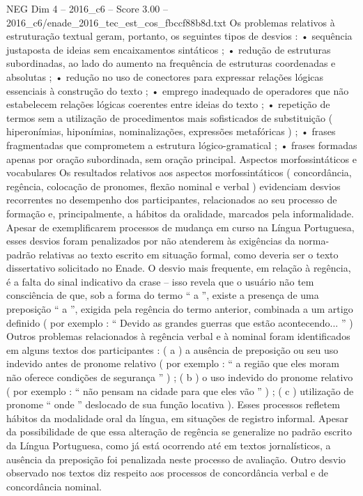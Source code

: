 \begin{textsample}{NEG Dim 4 – 2016\_c6 – Score 3.00 – 2016\_c6/enade\_2016\_tec\_est\_cos\_fbccf88b8d.txt}
Os problemas relativos à estruturação textual geram, portanto, os seguintes tipos de desvios : • sequência justaposta de ideias sem encaixamentos sintáticos ; • redução de estruturas subordinadas, ao lado do aumento na frequência de estruturas coordenadas e absolutas ; • redução no uso de conectores para expressar relações lógicas essenciais à construção do texto ; • emprego inadequado de operadores que não estabelecem relações lógicas coerentes entre ideias do texto ; • repetição de termos sem a utilização de procedimentos mais sofisticados de substituição ( hiperonímias, hiponímias, nominalizações, expressões metafóricas ) ; • frases fragmentadas que comprometem a estrutura lógico-gramatical ; • frases formadas apenas por oração subordinada, sem oração principal.
Aspectos morfossintáticos e vocabulares Os resultados relativos aos aspectos morfossintáticos ( concordância, regência, colocação de pronomes, flexão nominal e verbal ) evidenciam desvios recorrentes no desempenho dos participantes, relacionados ao seu processo de formação e, principalmente, a hábitos da oralidade, marcados pela informalidade.
Apesar de exemplificarem processos de mudança em curso na Língua Portuguesa, esses desvios foram penalizados por não atenderem às exigências da norma-padrão relativas ao texto escrito em situação formal, como deveria ser o texto dissertativo solicitado no Enade.
O desvio mais frequente, em relação à regência, é a falta do sinal indicativo da crase – isso revela que o usuário não tem consciência de que, sob a forma do termo “ a ”, existe a presença de uma preposição “ a ”, exigida pela regência do termo anterior, combinada a um artigo definido ( por exemplo : “ Devido as grandes guerras que estão acontecendo... ” ) Outros problemas relacionados à regência verbal e à nominal foram identificados em alguns textos dos participantes : ( a ) a ausência de preposição ou seu uso indevido antes de pronome relativo ( por exemplo : “ a região que eles moram não oferece condições de segurança ” ) ; ( b ) o uso indevido do pronome relativo ( por exemplo : “ não pensam na cidade para que eles vão ” ) ; ( c ) utilização de pronome “ onde ” deslocado de sua função locativa ).
Esses processos refletem hábitos da modalidade oral da língua, em situações de registro informal.
Apesar da possibilidade de que essa alteração de regência se generalize no padrão escrito da Língua Portuguesa, como já está ocorrendo até em textos jornalísticos, a ausência da preposição foi penalizada neste processo de avaliação.
Outro desvio observado nos textos diz respeito aos processos de concordância verbal e de concordância nominal.

\end{textsample}
